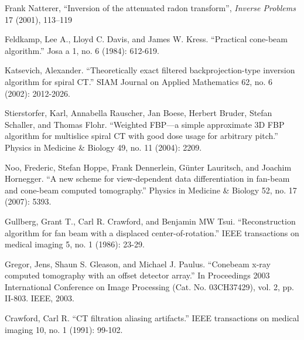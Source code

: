 \documentclass[11pt]{article}
\begin{document}
\begin{thebibliography}{100}
 Frank Natterer, ``Inversion of the attenuated radon transform'', \emph{Inverse Problems} 17 (2001), 113–119

 Feldkamp, Lee A., Lloyd C. Davis, and James W. Kress. ``Practical cone-beam algorithm.'' Josa a 1, no. 6 (1984): 612-619.

 Katsevich, Alexander. ``Theoretically exact filtered backprojection-type inversion algorithm for spiral CT.'' SIAM Journal on Applied Mathematics 62, no. 6 (2002): 2012-2026.

 Stierstorfer, Karl, Annabella Rauscher, Jan Boese, Herbert Bruder, Stefan Schaller, and Thomas Flohr. ``Weighted FBP—a simple approximate 3D FBP algorithm for multislice spiral CT with good dose usage for arbitrary pitch.'' Physics in Medicine \& Biology 49, no. 11 (2004): 2209.

 Noo, Frederic, Stefan Hoppe, Frank Dennerlein, Günter Lauritsch, and Joachim Hornegger. ``A new scheme for view-dependent data differentiation in fan-beam and cone-beam computed tomography.'' Physics in Medicine \& Biology 52, no. 17 (2007): 5393.

 Gullberg, Grant T., Carl R. Crawford, and Benjamin MW Tsui. ``Reconstruction algorithm for fan beam with a displaced center-of-rotation.'' IEEE transactions on medical imaging 5, no. 1 (1986): 23-29.

 Gregor, Jens, Shaun S. Gleason, and Michael J. Paulus. ``Conebeam x-ray computed tomography with an offset detector array.'' In Proceedings 2003 International Conference on Image Processing (Cat. No. 03CH37429), vol. 2, pp. II-803. IEEE, 2003.

 Crawford, Carl R. ``CT filtration aliasing artifacts.'' IEEE transactions on medical imaging 10, no. 1 (1991): 99-102.

\end{thebibliography}
\end{document}
